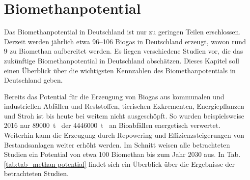\section{Biomethanpotential}

Das Biomethanpotential in Deutschland ist nur zu geringen Teilen erschlossen. Derzeit werden jährlich etwa \SIrange{96}{106}{\twhHs} Biogas in Deutschland erzeugt, wovon rund \SI{9}{\twhHs} zu Biomethan aufbereitet werden. Es liegen verschiedene Studien vor, die das zukünftige Biomethanpotential in Deutschland abschätzen. Dieses Kapitel soll einen Überblick über die wichtigsten Kennzahlen des Biomethanpotentials in Deutschland geben. \smallskip

Bereits das Potential für die Erzeugung von Biogas aus kommunalen und industriellen Abfällen und Reststoffen, tierischen Exkrementen, Energiepflanzen und Stroh ist bis heute bei weitem nicht ausgeschöpft. So wurden beispielsweise \SI{2016}{\relax} nur \SI{89000}{\tonne\peranno} der \SI{4446000}{\tonne\peranno} an Bioabfällen energetisch verwertet. Weiterhin kann die Erzeugung durch Repowering und Effizienzsteigerungen von Bestandsanlagen weiter erhöht werden. Im Schnitt weisen alle betrachteten Studien ein Potential von etwa \SI{100}{\twhHs} Biomethan bis zum Jahr 2030 aus. In Tab. \ref{tab:tab_methan-potential} findet sich ein Überblick über die Ergebnisse der betrachteten Studien.



